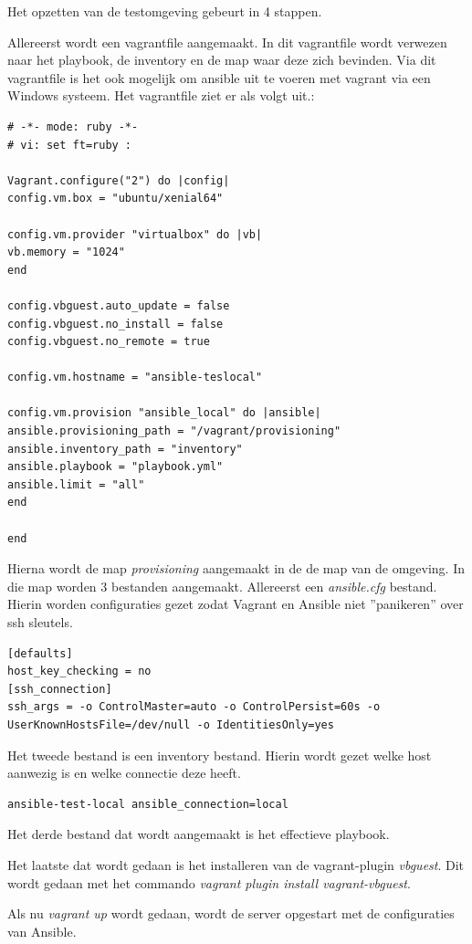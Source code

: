 Het opzetten van de testomgeving gebeurt in 4 stappen. 

Allereerst wordt een vagrantfile aangemaakt. In dit vagrantfile wordt verwezen naar het playbook, de inventory en de map waar deze zich bevinden. Via dit vagrantfile is het ook mogelijk om ansible uit te voeren met vagrant via een Windows systeem. Het vagrantfile ziet er als volgt uit.:
\begin{lstlisting}
# -*- mode: ruby -*-
# vi: set ft=ruby :

Vagrant.configure("2") do |config|
config.vm.box = "ubuntu/xenial64"

config.vm.provider "virtualbox" do |vb|
vb.memory = "1024"
end

config.vbguest.auto_update = false
config.vbguest.no_install = false
config.vbguest.no_remote = true

config.vm.hostname = "ansible-teslocal"

config.vm.provision "ansible_local" do |ansible|
ansible.provisioning_path = "/vagrant/provisioning"
ansible.inventory_path = "inventory"
ansible.playbook = "playbook.yml"
ansible.limit = "all"
end

end
\end{lstlisting}

Hierna wordt de map \textit{provisioning} aangemaakt in de de map van de omgeving. In die map worden 3 bestanden aangemaakt. Allereerst een \textit{ansible.cfg} bestand. Hierin worden configuraties gezet zodat Vagrant en Ansible niet ''panikeren'' over ssh sleutels.
\begin{lstlisting}
[defaults]
host_key_checking = no
[ssh_connection]
ssh_args = -o ControlMaster=auto -o ControlPersist=60s -o UserKnownHostsFile=/dev/null -o IdentitiesOnly=yes
\end{lstlisting}
Het tweede bestand is een inventory bestand. Hierin wordt gezet welke host aanwezig is en welke connectie deze heeft.
\begin{lstlisting}
ansible-test-local ansible_connection=local
\end{lstlisting}

Het derde bestand dat wordt aangemaakt is het effectieve playbook.

Het laatste dat wordt gedaan is het installeren van de vagrant-plugin \textit{vbguest}. Dit wordt gedaan met het commando \textit{vagrant plugin install vagrant-vbguest}.

Als nu \textit{vagrant up} wordt gedaan, wordt de server opgestart met de configuraties van Ansible.

